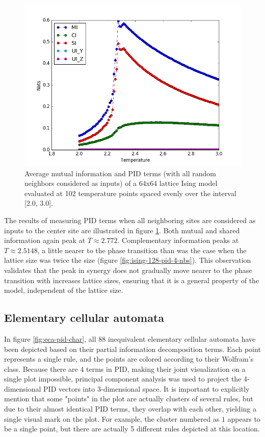 \documentclass[12pt]{article}
\begin{document}
\begin{figure} [h]
\begin{center}
\includegraphics[width=.9\textwidth]{ising-64-pid-4-nbs}
\caption{Average mutual information and PID terms (with all random neighbors considered as inputs) of a 64x64 lattice Ising model evaluated at 102 temperature points spaced evenly over the interval [2.0, 3.0].}
\label{fig:ising-64-pid-4-nbs}
\end{center}
\end{figure}

The results of measuring PID terms when all neighboring sites are considered as inputs to the center site are illustrated in figure \ref{fig:ising-64-pid-4-nbs}. Both mutual and shared information again peak at $T \approx 2.772$. Complementary information peaks at $T \approx 2.5148$, a little nearer to the phase transition than was the case when the lattice size was twice the size (figure \ref{fig:ising-128-pid-4-nbs}). This observation validates that the peak in synergy does not gradually move nearer to the phase transition with increases lattice sizes, ensuring that it is a general property of the model, independent of the lattice size.

\subsection{Elementary cellular automata}

In figure \ref{fig:eca-pid-char}, all 88 inequivalent elementary cellular automata have been depicted based on their partial information decomposition terms. Each point represents a single rule, and the points are colored according to their Wolfram's class. Because there are 4 terms in PID, making their joint visualization on a single plot impossible, principal component analysis was used to project the 4-dimensional PID vectors into 3-dimensional space. It is important to explicitly mention that some "points" in the plot are actually clusters of several rules, but due to their almost identical PID terms, they overlap with each other, yielding a single visual mark on the plot.  For example, the cluster numbered as $1$ appears to be a single point, but there are actually 5 different rules depicted at this location.   
\end{document}
